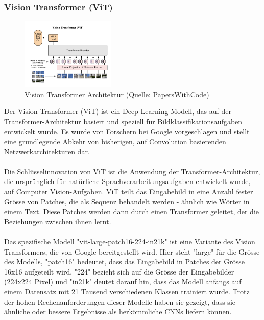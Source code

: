 \documentclass{article}
\begin{document}
\newpage
\subsubsection{Vision Transformer (ViT)}

\begin{figure}[!h]
    \centering
    \includegraphics[width=0.4\textwidth]{images/model_architecture/vit.png}
    \caption{\label{fig:resnet_50_architecture}Vision Transformer Architektur (Quelle: \href{https://paperswithcode.com/method/vision-transformer}{PapersWithCode})}
\end{figure}

Der Vision Transformer (ViT) \cite{dosovitskiy_image_2021} ist ein Deep Learning-Modell, das auf der Transformer-Architektur basiert und speziell für Bildklassifikationsaufgaben entwickelt wurde. Es wurde von Forschern bei Google vorgeschlagen und stellt eine grundlegende Abkehr von bisherigen, auf Convolution basierenden Netzwerkarchitekturen dar.\\\\
Die Schlüsselinnovation von ViT ist die Anwendung der Transformer-Architektur, die ursprünglich für natürliche Sprachverarbeitungsaufgaben entwickelt wurde, auf Computer Vision-Aufgaben. ViT teilt das Eingabebild in eine Anzahl fester Grösse von Patches, die als Sequenz behandelt werden - ähnlich wie Wörter in einem Text. Diese Patches werden dann durch einen Transformer geleitet, der die Beziehungen zwischen ihnen lernt.\\\\
Das spezifische Modell "vit-large-patch16-224-in21k" ist eine Variante des Vision Transformers, die von Google bereitgestellt wird. Hier steht "large" für die Grösse des Modells, "patch16" bedeutet, dass das Eingabebild in Patches der Grösse 16x16 aufgeteilt wird, "224" bezieht sich auf die Grösse der Eingabebilder (224x224 Pixel) und "in21k" deutet darauf hin, dass das Modell anfangs auf einem Datensatz mit 21 Tausend verschiedenen Klassen trainiert wurde. Trotz der hohen Rechenanforderungen dieser Modelle haben sie gezeigt, dass sie ähnliche oder bessere Ergebnisse als herkömmliche CNNs liefern können.
\end{document}
